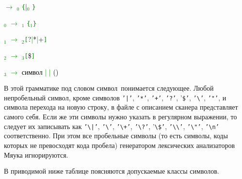 \documentclass[10pt]{report}
\begin{document}
\textcolor{Green}{ $\to$ $_0$ \texttt{\{}\textcolor{Black}{|}$_0$ \texttt{\}}
}

\textcolor{Green}{$_0$ $\to$ $_1$ \texttt{\{}$_1$\texttt{\}}
}

\textcolor{Green}{$_1$ $\to$ $_2$\texttt{[}\textcolor{Black}{?}|\textcolor{Black}{*}|\textcolor{Black}{+}\texttt{]} }

\textcolor{Green}{$_2$ $\to$ $_3$\texttt{[}\textcolor{Black}{\$}\texttt{]} }

\textcolor{Green}{$_3$ $\to$ \textcolor{Black}{символ} |  | \textcolor{Black}{(}\textcolor{Black}{)}}


В этой грамматике под словом \glqq символ\grqq\ понимается следующее. Любой непробельный символ, кроме символов \texttt{'|'}, \texttt{'*'}, \texttt{'+'}, \texttt{'?'},
'\texttt{\$'}, \texttt{'\textbackslash'}, \texttt{'"{}'}, и символа перехода на новую строку, в файле с описанием сканера представляет самого себя. Если же эти символы нужно
указать в регулярном выражении, то следует их записывать как \texttt{'\textbackslash|'}, \texttt{'\textbackslash*'}, \texttt{'\textbackslash+'}, \texttt{'\textbackslash?'},
'\texttt{\textbackslash\$'}, \texttt{'\textbackslash\textbackslash'}, \texttt{'\textbackslash"{}'}, \texttt{'\textbackslash{}n'} соответственно. При этом все пробельные 
символы (то есть символы, коды которых не превосходят кода пробела) генератором лексических анализаторов Мяука игнорируются.

В приводимой ниже таблице поясняются допускаемые классы символов. %
\end{document}
